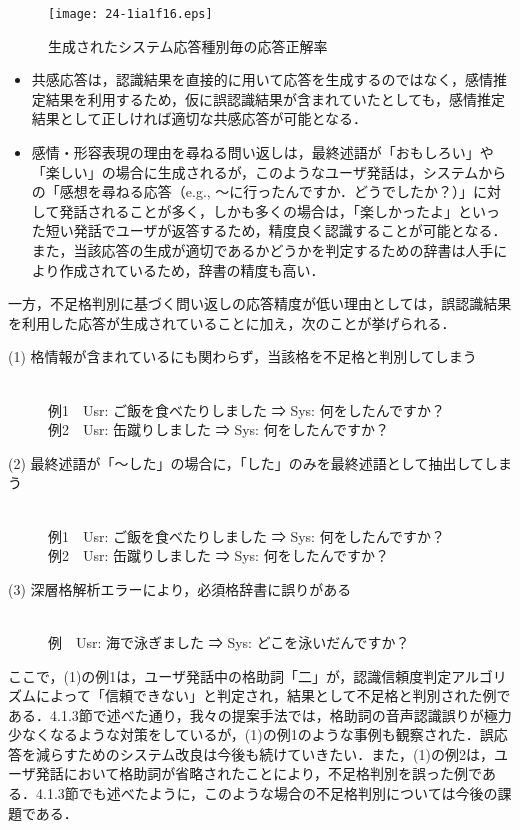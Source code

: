 \documentclass[japanese]{jnlp_1.4}
\begin{document}
\begin{figure}[t]
\begin{center}
\texttt{[image: 24-1ia1f16.eps]}
\end{center}
\caption{生成されたシステム応答種別毎の応答正解率}
\label{fig:16}
\end{figure}

\begin{itemize}
\item 共感応答は，認識結果を直接的に用いて応答を生成するのではなく，感情推定結果を利用するため，仮に誤認識結果が含まれていたとしても，感情推定結果として正しければ適切な共感応答が可能となる．

\item 感情・形容表現の理由を尋ねる問い返しは，最終述語が「おもしろい」や「楽しい」の場合に生成されるが，このようなユーザ発話は，システムからの「感想を尋ねる応答（e.g., 〜に行ったんですか．どうでしたか？）」に対して発話されることが多く，しかも多くの場合は，「楽しかったよ」といった短い発話でユーザが返答するため，精度良く認識することが可能となる．また，当該応答の生成が適切であるかどうかを判定するための辞書は人手により作成されているため，辞書の精度も高い．
\end{itemize}

一方，不足格判別に基づく問い返しの応答精度が低い理由としては，誤認識結果を利用した応答が生成されていることに加え，次のことが挙げられる．

\begin{description}
\item[(1) 格情報が含まれているにも関わらず，当該格を不足格と判別してしまう]\mbox{}\\
例1　Usr: ご飯を食べたりしました ⇒ Sys: 何をしたんですか？\\
例2　Usr: 缶蹴りしました ⇒ Sys: 何をしたんですか？

\item[(2) 最終述語が「〜した」の場合に，「した」のみを最終述語として抽出してしまう]\mbox{}\\
例1　Usr: ご飯を食べたりしました ⇒ Sys: 何をしたんですか？\\
例2　Usr: 缶蹴りしました ⇒ Sys: 何をしたんですか？

\item[(3) 深層格解析エラーにより，必須格辞書に誤りがある]\mbox{}\\
例　Usr: 海で泳ぎました ⇒ Sys: どこを泳いだんですか？
\end{description}

ここで，(1)の例1は，ユーザ発話中の格助詞「二」が，認識信頼度判定アルゴリズムによって「信頼できない」と判定され，結果として不足格と判別された例である．4.1.3節で述べた通り，我々の提案手法では，格助詞の音声認識誤りが極力少なくなるような対策をしているが，(1)の例1のような事例も観察された．誤応答を減らすためのシステム改良は今後も続けていきたい．また，(1)の例2は，ユーザ発話において格助詞が省略されたことにより，不足格判別を誤った例である．4.1.3節でも述べたように，このような場合の不足格判別については今後の課題である．
\end{document}
